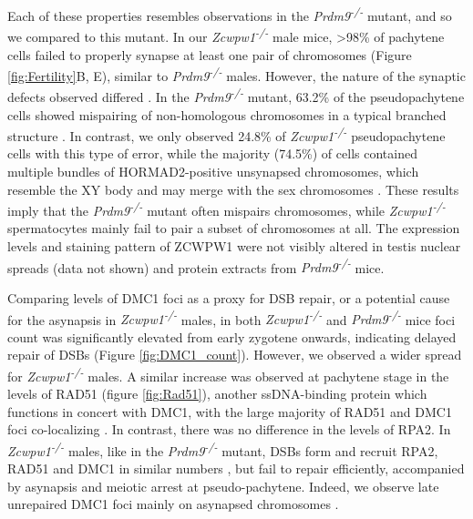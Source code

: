 Each of these properties resembles observations in the \textit{Prdm9\textsuperscript{-/-}} mutant, and so we compared to this mutant. In our \textit{Zcwpw1\textsuperscript{-/-}} male mice, >98\% of pachytene cells failed to properly synapse at least one pair of chromosomes (Figure \ref{fig:Fertility}B, E), similar to \textit{Prdm9\textsuperscript{-/-}} males. However, the nature of the synaptic defects observed differed \iffalse supp table 4\fi. In the \textit{Prdm9\textsuperscript{-/-}} mutant, 63.2\% of the pseudopachytene cells showed mispairing of non-homologous chromosomes in a typical branched structure \iffalse tangled in supp table 4\fi. In contrast, we only observed 24.8\% of \textit{Zcwpw1\textsuperscript{-/-}} pseudopachytene cells with this type of error, while the majority (74.5\%) of cells contained multiple bundles of HORMAD2-positive unsynapsed chromosomes, which resemble the XY body and may merge with the sex chromosomes \iffalse multibodies in supp table 5 \fi. These results imply that the \textit{Prdm9\textsuperscript{-/-}} mutant often mispairs chromosomes, while \textit{Zcwpw1\textsuperscript{-/-}} spermatocytes mainly fail to pair a subset of chromosomes at all. The expression levels and staining pattern of ZCWPW1 were not visibly altered in testis nuclear spreads (data not shown) and protein extracts from \textit{Prdm9\textsuperscript{-/-}} mice.

Comparing levels of DMC1 foci as a proxy for DSB repair, or a potential cause for the asynapsis in \textit{Zcwpw1\textsuperscript{-/-}} males, in both \textit{Zcwpw1\textsuperscript{-/-}} and \textit{Prdm9\textsuperscript{-/-}} mice foci count was significantly elevated from early zygotene onwards, indicating delayed repair of DSBs (Figure \ref{fig:DMC1_count}). However, we observed a wider spread for \textit{Zcwpw1\textsuperscript{-/-}} males. A similar increase was observed at pachytene stage in the levels of RAD51 (figure \ref{fig:Rad51}), another ssDNA-binding protein which functions in concert with DMC1, with the large majority of RAD51 and DMC1 foci co-localizing \parencite{Brown2015Small, Tarsounas1999RAD51}. In contrast, there was no difference in the levels of RPA2. In \textit{Zcwpw1\textsuperscript{-/-}} males, like in the \textit{Prdm9\textsuperscript{-/-}} mutant, DSBs form and recruit RPA2, RAD51 and DMC1 in similar numbers \parencite{Li2019histone}, but fail to repair efficiently, accompanied by asynapsis and meiotic arrest at pseudo-pachytene. Indeed, we observe late unrepaired DMC1 foci mainly on asynapsed chromosomes \iffalse supp fig 8 \fi.

